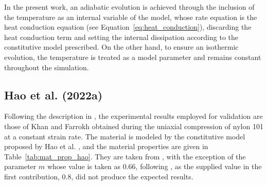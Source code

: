 In the present work, an adiabatic evolution is achieved through the inclusion of the temperature as an internal variable of the model, whose rate equation is the heat conduction equation (see Equation~\eqref{eq:heat_conduction}), discarding the heat conduction term and setting the internal dissipation according to the constitutive model prescribed.
On the other hand, to ensure an isothermic evolution, the temperature is treated as a model parameter and remains constant throughout the simulation.

\subsection{Hao et al. (2022a)}

Following the description in \cite{haoUnifiedAmorphousCrystalline2022}, the experimental results employed for validation are those of Khan and Farrokh \citep{khanThermomechanicalResponseNylon2006} obtained during the uniaxial compression of nylon 101 at a constant strain rate.
The material is modeled by the constitutive model proposed by Hao et al. \citep{haoUnifiedAmorphousCrystalline2022}, and the material properties are given in Table~\ref{tab:mat_prop_hao}.
They are taken from \cite{haoUnifiedAmorphousCrystalline2022}, with the exception of the parameter $m$ whose value is taken as \num{0.66}, following \cite{haoRatedependentConstitutiveModel2022}, as the supplied value in the first contribution, \num{0.8}, did not produce the expected results.
%
